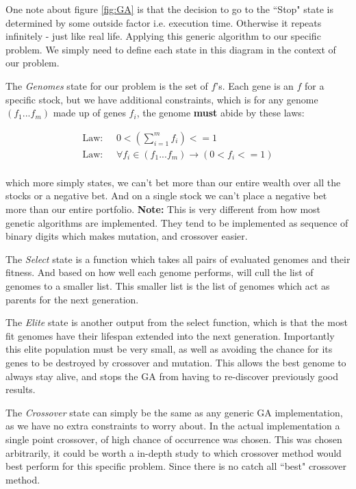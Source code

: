 \documentclass[11pt]{article}
\begin{document}
    One note about figure \ref{fig:GA} is that the decision to go to the ``Stop"
    state is determined by some outside factor i.e. execution time. Otherwise
    it repeats infinitely - just like real life. Applying this generic algorithm to 
    our specific problem. We simply need to
    define each state in this diagram in the context of our problem.

    The \textit{Genomes} state for our problem is the set of \(f\)'s. Each gene is an
    \(f\) for a specific stock, but we have additional constraints, which is for 
    any genome \((f_1...f_m)\) made up of genes \(f_i\), the genome \textbf{must}
    abide by these laws:

    \begin{align*}
        \text{Law: } & \;
        0 < \left(
            \displaystyle\sum^{m}_{i=1} f_i
        \right) <= 1 \\
        \text{Law: } & \;
        \forall f_i \in (f_1...f_m) \to \left(
            0 < f_i <= 1
        \right) \\
    \end{align*}

    which more simply states, we can't bet more than our entire wealth over all the stocks or
    a negative bet. And on a single stock we can't place a negative bet more than our
    entire portfolio. \textbf{Note:} This is very different from how most genetic algorithms
    are implemented. They tend to be implemented as sequence of binary digits which makes
    mutation, and crossover easier. 

    The \textit{Select} state is a function which takes all pairs of evaluated genomes
    and their fitness. And based on how well each genome performs, will cull the
    list of genomes to a smaller list. This smaller list is the list of genomes
    which act as parents for the next generation.

    The \textit{Elite} state is another output from the select function, which is
    that the most fit genomes have their lifespan extended into the next generation.
    Importantly this elite population must be very small, as well as avoiding the
    chance for its genes to be destroyed by crossover and mutation. \cite{DeJong}
    This allows the best genome to always stay alive, and stops the GA from
    having to re-discover previously good results.

    The \textit{Crossover} state can simply be the same as any generic GA implementation,
    as we have no extra constraints to worry about. In the actual implementation
    a single point crossover, of high chance of occurrence was chosen. This was
    chosen arbitrarily, it could be worth a in-depth study to which crossover
    method would best perform for this specific problem. Since there is no catch all
    ``best" crossover method.
\end{document}
